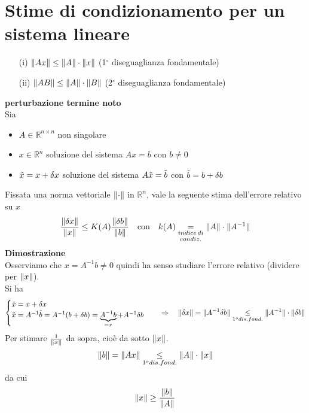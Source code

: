 \section{Stime di condizionamento per un sistema lineare }
\begin{itemize}
	\item[(i)]$\lVert Ax\rVert \leq \lVert A\rVert\cdot\lVert x\rVert$ (1$^\circ$ diseguaglianza fondamentale)
	\item[(ii)] $\lVert AB\rVert \leq \lVert A\rVert \cdot\lVert B\rVert$ (2$^\circ$ diseguaglianza fondamentale)
\end{itemize}
\textbf{ perturbazione termine noto}\\
Sia
\begin{itemize}
	\item  $A \in \mathbb{R}^{n\times n}$ non singolare
	\item $x \in \mathbb{R}^n$ soluzione del sistema $Ax=b$ con $b \neq 0$
	\item $\Tilde{x}=x+\delta x$ soluzione del sistema $A\Tilde{x}=\Tilde{b}$ con $\Tilde{b}=b+\delta b$
\end{itemize}
Fissata una norma vettoriale $\lVert\cdot\rVert$ in $\mathbb{R}^n$, vale la seguente stima dell'errore relativo su $x$
\begin{equation*}
\frac{\lVert\delta x\rVert}{\lVert x\rVert} \leq K(A) \frac{\lVert\delta b\rVert}{\lVert b\rVert} \quad \text{con} \quad k(A)\underset{condiz.}{\underset{indice\,di}{=}}\lVert A\rVert\cdot\lVert A^{-1}\rVert
\end{equation*}
\textbf{Dimostrazione}\\
Osserviamo che $x=A^{-1}b\neq0$ quindi ha senso studiare l'errore relativo (dividere per $\lVert x\rVert$). \\Si ha
\begin{equation*}
\begin{cases}
\tilde{x} = x + \delta x \\
\tilde{x}=A^{-1}\tilde{b}=A^{-1}(b+\delta b)=\underbrace{A^{-1}b}_{= x}+A^{-1}\delta b
\end{cases}
\quad \Rightarrow \quad \lVert\delta x\rVert=\lVert A^{-1}\delta b\rVert\underset{1^o dis. fond.}{\leq}\lVert A^{-1}\rVert\cdot\lVert\delta b\rVert
\end{equation*}
Per stimare $\frac{1}{\lVert x\rVert}$ da sopra, cioè da sotto $\lVert x\rVert$.
\begin{equation*}
\lVert b\rVert=\lVert Ax\rVert\underset{1^o dis. fond.}{\leq}\lVert A\rVert\cdot\lVert x\rVert
\end{equation*}
da cui
\begin{equation*}
\lVert x\rVert\geq\frac{\lVert b\rVert}{\lVert A\rVert}
\end{equation*}
